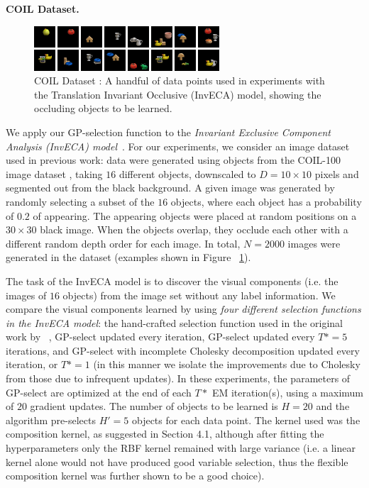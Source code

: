 
\textbf{COIL Dataset.}
%
\begin{figure}[t!]%
\centering
\includegraphics[width=.5\textwidth]{inveca/dataSamples.png}%
\caption{COIL Dataset \citep{coil100}: 
A handful of data points used in experiments with the Translation Invariant Occlusive (InvECA) model, showing the occluding objects to be learned.
}
\label{fig:inveca-data}
\end{figure}
%
We apply our GP-selection function to the \emph{Invariant Exclusive Component Analysis (InvECA) model}~\citep{DaiLucke2012b,DaiEtAl2013}.
For our experiments, we consider an image dataset used in previous work: data were generated using objects from the COIL-100 image dataset \citep{coil100}, taking $16$ different objects, downscaled to $D=10 \times 10$ pixels and segmented out from the black background.
A given image was generated by randomly selecting a subset of the $16$ objects, where each object has a probability of $0.2$ of appearing.
The appearing objects were placed at random positions on a $30 \times 30$ black image.
When the objects overlap, they occlude each other with a different random depth order for each image.
In total, $N=2000$ images were generated in the dataset (examples shown in Figure~ \ref{fig:inveca-data}).%

The task of the InvECA model is to discover the visual components (i.e. the images of $16$ objects) from the image set without any label information. 
We compare the visual components learned by using \emph{four different selection functions in the InvECA model}: the hand-crafted selection function used in the original work by ~\citet{DaiLucke2012b}, GP-select updated every iteration, GP-select updated every $T*=5$ iterations, and GP-select with incomplete Cholesky decomposition updated every iteration, or $T*=1$ (in this manner we isolate the improvements due to Cholesky from those due to infrequent updates). 
In these experiments, the parameters of GP-select are optimized at the end of each $T*$ EM iteration(s), using a maximum of $20$ gradient updates.
The number of objects to be learned is $H=20$ and the algorithm pre-selects $H'=5$ objects for each data point.
The kernel used was the composition kernel, as suggested in Section 4.1, although after fitting the hyperparameters only the RBF kernel remained with large variance (i.e. a linear kernel alone would not have produced good variable selection, thus the flexible composition kernel was further shown to be a good choice).

